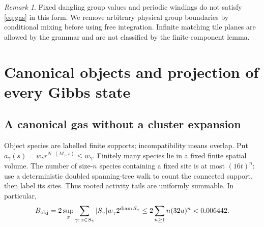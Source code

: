 \documentclass[11pt,reqno]{amsart}
\numberwithin{equation}{section}
\theoremstyle{definition}
\theoremstyle{remark}
\newtheorem{remark}[theorem]{Remark}
\newcommand{\diam}{\operatorname{diam}}
\begin{document}
\begin{remark}
Fixed dangling group values and periodic windings do not satisfy \eqref{eq:gas} in this form. We remove arbitrary physical group boundaries by conditional mixing before using free integration. Infinite matching tile planes are allowed by the grammar and are not classified by the finite-component lemma.
\end{remark}


\section{Canonical objects and projection of every Gibbs state}\label{sec:projection}

\subsection{A canonical gas without a cluster expansion}
Object species are labelled finite supports; incompatibility means overlap. Put $a_\gamma(s)=w_\gamma r^{N_-(M_\gamma,s)}\leq w_\gamma$. Finitely many species lie in a fixed finite spatial volume. The number of size-$n$ species containing a fixed site is at most $(16t)^n$: use a deterministic doubled spanning-tree walk to count the connected support, then label its sites. Thus rooted activity tails are uniformly summable. In particular,
\begin{equation}\label{eq:Bp}
 B_{\rm obj}=2\sup_x\sum_{\gamma:\,x\in S_\gamma}|S_\gamma|w_\gamma2^{\diam S_\gamma}
 \leq2\sum_{n\geq1}n(32u)^n<0.006442.
\end{equation}
\end{document}

